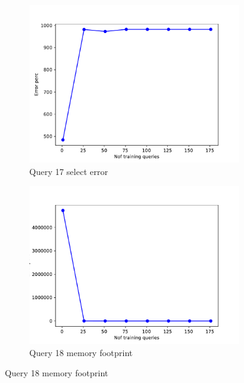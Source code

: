 \begin{figure}[!htb]
     \begin{subfigure}[t]{0.5\textwidth}
       \includegraphics[scale=0.4]{figs/tpch10/tpch10_sel17_error.pdf}
       \caption{Query 17 select error}
       \label{fig:tpch_sel17}
     \end{subfigure}
     \begin{subfigure}[t]{0.5\textwidth}
       \includegraphics[scale=0.4]{figs/tpch10/tpch10_sel18_error.pdf}
       \caption{Query 18 memory footprint}
       \label{fig:tpch_sel18}
      \end{subfigure}
\end{figure}

